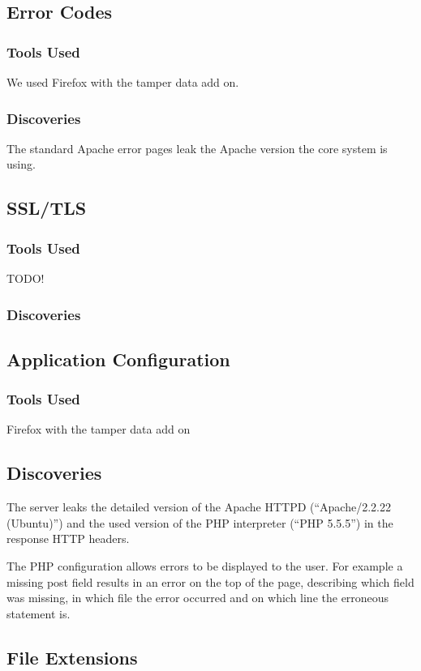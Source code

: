 \documentclass{article}
\begin{document}
\subsection{Error Codes}
\subsubsection{Tools Used}
We used Firefox with the tamper data add on.

\subsubsection{Discoveries}
The standard Apache error pages leak the Apache version the core system is using.

\subsection{SSL/TLS}
\subsubsection{Tools Used}
TODO!

\subsubsection{Discoveries}


\subsection{Application Configuration}
\subsubsection{Tools Used}
Firefox with the tamper data add on

\subsection{Discoveries}
The server leaks the detailed version of the Apache HTTPD (``Apache/2.2.22 (Ubuntu)'') and the used version of the PHP interpreter (``PHP 5.5.5'') in the response HTTP headers.

The PHP configuration allows errors to be displayed to the user. For example a missing post field results in an error on the top of the page, describing which field was missing, in which file the error occurred and on which line the erroneous statement is.

\subsection{File Extensions}
\end{document}
